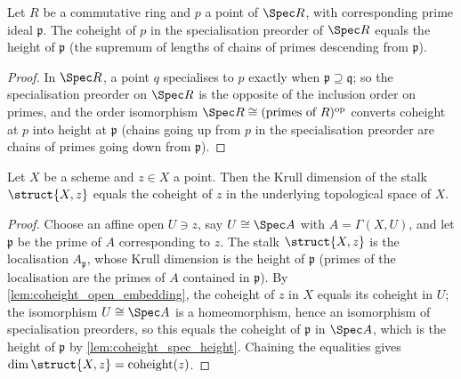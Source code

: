 \begin{lemma}
  \label{lem:coheight_spec_height}
  \leanok
  Let \(R\) be a commutative ring and \(p\) a point of \(\Spec R\), with corresponding
  prime ideal \(\mathfrak p\). The coheight of \(p\) in the specialisation preorder of
  \(\Spec R\) equals the height of \(\mathfrak p\) (the supremum of lengths of chains of
  primes descending from \(\mathfrak p\)).
\end{lemma}
\begin{proof}
  \leanok
  In \(\Spec R\), a point \(q\) specialises to \(p\) exactly when
  \(\mathfrak p \supseteq \mathfrak q\); so the specialisation preorder on
  \(\Spec R\) is the opposite of the inclusion order on primes, and the order
  isomorphism \(\Spec R \cong (\text{primes of } R)^{\mathrm{op}}\) converts coheight at
  \(p\) into height at \(\mathfrak p\) (chains going up from \(p\) in the
  specialisation preorder are chains of primes going down from \(\mathfrak p\)).
\end{proof}

\begin{theorem}
  \label{thm:stalk_dim_coheight}
  \leanok
  Let \(X\) be a scheme and \(z \in X\) a point. Then the Krull dimension of the stalk
  \(\struct{X,z}\) equals the coheight of \(z\) in the underlying topological space of
  \(X\).
\end{theorem}
\begin{proof}
  \leanok
  Choose an affine open \(U \ni z\), say \(U \cong \Spec A\) with
  \(A = \Gamma(X, U)\), and let \(\mathfrak p\) be the prime of \(A\) corresponding to
  \(z\). The stalk \(\struct{X,z}\) is the localisation \(A_{\mathfrak p}\), whose Krull
  dimension is the height of \(\mathfrak p\) (primes of the localisation are the primes
  of \(A\) contained in \(\mathfrak p\)). By \ref{lem:coheight_open_embedding}, the
  coheight of \(z\) in \(X\) equals its coheight in \(U\); the isomorphism
  \(U \cong \Spec A\) is a homeomorphism, hence an isomorphism of specialisation
  preorders, so this equals the coheight of \(\mathfrak p\) in \(\Spec A\), which is the
  height of \(\mathfrak p\) by \ref{lem:coheight_spec_height}. Chaining the equalities
  gives \(\dim \struct{X,z} = \mathrm{coheight}(z)\).
\end{proof}

